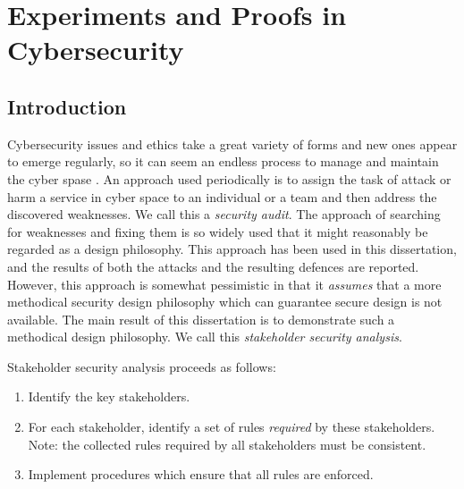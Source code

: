
\chapter{Experiments and Proofs in Cybersecurity }
\section{Introduction}
\thispagestyle{empty}
\pagestyle{empty}
% 
% 
% 
% 


Cybersecurity issues and ethics  take a great variety of forms and new ones appear to emerge regularly, so it can seem an endless process to manage and maintain the cyber spase \cite{josang2005user}. An approach used periodically is to assign the task of attack or harm   a service in cyber space  to an individual or a team and then address the discovered weaknesses. We call this a {\em security audit}. The approach of searching for weaknesses and fixing them is so widely used that it might reasonably be regarded as a design philosophy.
This approach has been used in this dissertation, and the results of
both the attacks and the resulting defences are reported.
However, this approach is somewhat pessimistic in that it {\em assumes}
that a more methodical security design philosophy which can guarantee
secure design is not available. The main result
of this dissertation is to demonstrate such a methodical design philosophy.
We call this {\em stakeholder security analysis}.

Stakeholder security analysis proceeds as follows: 
\begin{enumerate}[1.]
\item Identify the key stakeholders.
\item For each stakeholder, identify a set of rules {\em required}
by these stakeholders. Note: the collected rules required
by all stakeholders must be consistent.
\item Implement procedures which ensure that all rules are enforced.
\end{enumerate}


